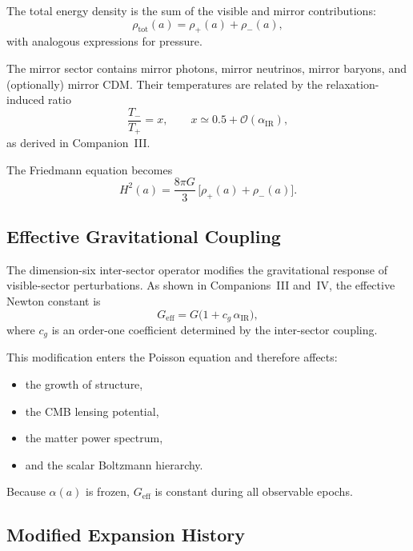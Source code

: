 \documentclass[11pt,a4paper]{article}
\begin{document}
The total energy density is the sum of the visible and mirror contributions:
\begin{equation}
    \rho_{\mathrm{tot}}(a) = \rho_{+}(a) + \rho_{-}(a),
\end{equation}
with analogous expressions for pressure.

The mirror sector contains mirror photons, mirror neutrinos, mirror baryons, and (optionally)
mirror CDM. Their temperatures are related by the relaxation-induced ratio
\begin{equation}
    \frac{T_{-}}{T_{+}} = x, \qquad x \simeq 0.5 + \mathcal{O}(\alpha_{\mathrm{IR}}),
\end{equation}
as derived in Companion~III.

The Friedmann equation becomes
\begin{equation}
    H^{2}(a)
    = \frac{8\pi G}{3}\,\bigl[\rho_{+}(a) + \rho_{-}(a)\bigr].
\end{equation}

\subsection{Effective Gravitational Coupling}

The dimension-six inter-sector operator modifies the gravitational response of visible-sector
perturbations. As shown in Companions~III and~IV, the effective Newton constant is
\begin{equation}
    G_{\mathrm{eff}} = G\bigl(1 + c_{g}\,\alpha_{\mathrm{IR}}\bigr),
\end{equation}
where $c_{g}$ is an order-one coefficient determined by the inter-sector coupling.

This modification enters the Poisson equation and therefore affects:
\begin{itemize}
    \item the growth of structure,
    \item the CMB lensing potential,
    \item the matter power spectrum,
    \item and the scalar Boltzmann hierarchy.
\end{itemize}

Because $\alpha(a)$ is frozen, $G_{\mathrm{eff}}$ is constant during all observable epochs.

\subsection{Modified Expansion History}
\end{document}
